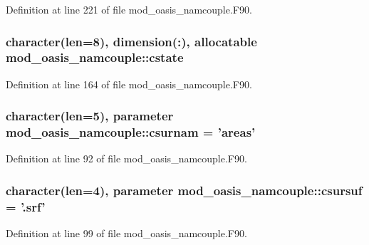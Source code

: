 Definition at line 221 of file mod\+\_\+oasis\+\_\+namcouple.\+F90.

\hypertarget{classmod__oasis__namcouple_a4b507ab44ad62713c9e3d83ded6be3f4}{
\subsubsection[{cstate}]{\setlength{\rightskip}{0pt plus 5cm}character(len=8), dimension(\+:), allocatable mod\+\_\+oasis\+\_\+namcouple\+::cstate\hspace{0.3cm}{\ttfamily [private]}}}\label{classmod__oasis__namcouple_a4b507ab44ad62713c9e3d83ded6be3f4}


Definition at line 164 of file mod\+\_\+oasis\+\_\+namcouple.\+F90.

\hypertarget{classmod__oasis__namcouple_a49e79935fc2421fe3e4e7422f17b34ea}{
\subsubsection[{csurnam}]{\setlength{\rightskip}{0pt plus 5cm}character(len=5), parameter mod\+\_\+oasis\+\_\+namcouple\+::csurnam = 'areas'\hspace{0.3cm}{\ttfamily [private]}}}\label{classmod__oasis__namcouple_a49e79935fc2421fe3e4e7422f17b34ea}


Definition at line 92 of file mod\+\_\+oasis\+\_\+namcouple.\+F90.

\hypertarget{classmod__oasis__namcouple_adf2c151a84c37bd7cd93867305b4f70b}{
\subsubsection[{csursuf}]{\setlength{\rightskip}{0pt plus 5cm}character(len=4), parameter mod\+\_\+oasis\+\_\+namcouple\+::csursuf = '.srf'\hspace{0.3cm}{\ttfamily [private]}}}\label{classmod__oasis__namcouple_adf2c151a84c37bd7cd93867305b4f70b}


Definition at line 99 of file mod\+\_\+oasis\+\_\+namcouple.\+F90.

